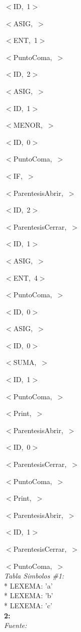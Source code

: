 \documentclass[a4paper, 12pt]{article}
\begin{document}
\mbox{$<$ID, 1$>$} 


\mbox{$<$ASIG, $>$ }


\mbox{$<$ENT, 1$>$ }


\mbox{$<$PuntoComa, $>$ }


\mbox{$<$ID, 2$>$ }


\mbox{$<$ASIG, $>$ }


\mbox{$<$ID, 1$>$ }


\mbox{$<$MENOR, $>$ }


\mbox{$<$ID, 0$>$ }


\mbox{$<$PuntoComa, $>$ }


\mbox{$<$IF, $>$ }


\mbox{$<$ParentesisAbrir, $>$ }


\mbox{$<$ID, 2$>$ }


\mbox{$<$ParentesisCerrar, $>$}

 
\mbox{$<$ID, 1$>$ }


\mbox{$<$ASIG, $>$ }


\mbox{$<$ENT, 4$>$ }


\mbox{$<$PuntoComa, $>$} 


\mbox{$<$ID, 0$>$ }


\mbox{$<$ASIG, $>$ }


\mbox{$<$ID, 0$>$ }


\mbox{$<$SUMA, $>$ }


\mbox{$<$ID, 1$>$ }


\mbox{$<$PuntoComa, $>$ }


\mbox{$<$Print, $>$ }


\mbox{$<$ParentesisAbrir, $>$ }


\mbox{$<$ID, 0$>$ }


\mbox{$<$ParentesisCerrar, $>$ }


\mbox{$<$PuntoComa, $>$ }


\mbox{$<$Print, $>$ }


\mbox{$<$ParentesisAbrir, $>$ }


\mbox{$<$ID, 1$>$ }


\mbox{$<$ParentesisCerrar, $>$ }


\mbox{$<$PuntoComa, $>$ }\medskip\\
\emph{Tabla Simbolos \#1:}\\ 
 \mbox{*} LEXEMA: 'a'\\
 \mbox{*} LEXEMA: 'b'\\
 \mbox{*} LEXEMA: 'c'\bigskip \\
\textbf{2:}\medskip\\
\emph{Fuente:}
\end{document}
